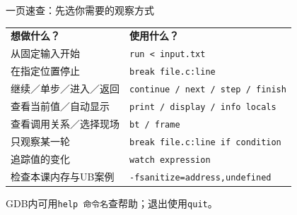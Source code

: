 \begin{frame}{一页速查：先选你需要的观察方式}
    \begin{center}
        \renewcommand{\arraystretch}{1.35}
        \begin{tabular}{ll}
            \textbf{想做什么？} & \textbf{使用什么？} \\
            从固定输入开始 & \texttt{run < input.txt} \\
            在指定位置停止 & \texttt{break file.c:line} \\
            继续／单步／进入／返回 & \texttt{continue / next / step / finish} \\
            查看当前值／自动显示 & \texttt{print / display / info locals} \\
            查看调用关系／选择现场 & \texttt{bt / frame} \\
            只观察某一轮 & \texttt{break file.c:line if condition} \\
            追踪值的变化 & \texttt{watch expression} \\
            检查本课内存与UB案例 & \texttt{-fsanitize=address,undefined}
        \end{tabular}
    \end{center}
    \small GDB内可用\texttt{help 命令名}查帮助；退出使用\texttt{quit}。
\end{frame}

